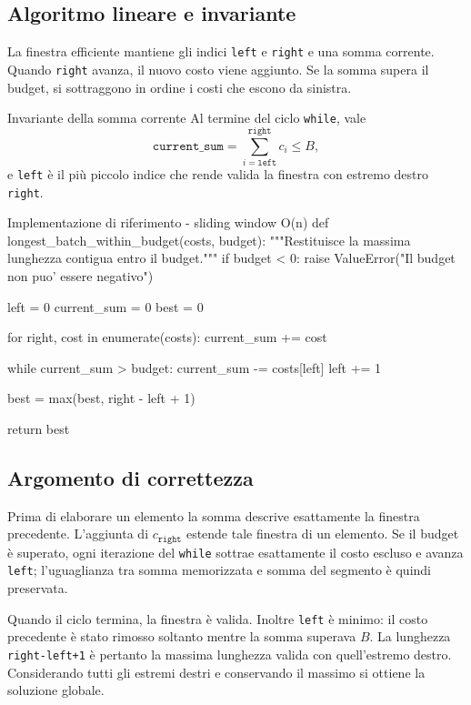 \clearpage
\thispagestyle{fancy}
\noindent\rule{0pt}{1cm}\par
\subsection{Algoritmo lineare e invariante}

La finestra efficiente mantiene gli indici \texttt{left} e \texttt{right} e
una somma corrente. Quando \texttt{right} avanza, il nuovo costo viene
aggiunto. Se la somma supera il budget, si sottraggono in ordine i costi che
escono da sinistra.

\begin{principlebox}{Invariante della somma corrente}
Al termine del ciclo \texttt{while}, vale
\[
\texttt{current\_sum}=\sum_{i=\texttt{left}}^{\texttt{right}}c_i\leq B,
\]
e \texttt{left} è il più piccolo indice che rende valida la finestra con
estremo destro \texttt{right}.
\end{principlebox}

\begin{efficientcode}{Implementazione di riferimento - sliding window O(n)}
def longest_batch_within_budget(costs, budget):
    """Restituisce la massima lunghezza contigua entro il budget."""
    if budget < 0:
        raise ValueError("Il budget non puo' essere negativo")

    left = 0
    current_sum = 0
    best = 0

    for right, cost in enumerate(costs):
        current_sum += cost

        while current_sum > budget:
            current_sum -= costs[left]
            left += 1

        best = max(best, right - left + 1)

    return best
\end{efficientcode}

\subsection{Argomento di correttezza}

Prima di elaborare un elemento la somma descrive esattamente la finestra
precedente. L'aggiunta di $c_{\texttt{right}}$ estende tale finestra di un
elemento. Se il budget è superato, ogni iterazione del \texttt{while} sottrae
esattamente il costo escluso e avanza \texttt{left}; l'uguaglianza tra somma
memorizzata e somma del segmento è quindi preservata.

Quando il ciclo termina, la finestra è valida. Inoltre \texttt{left} è minimo:
il costo precedente è stato rimosso soltanto mentre la somma superava $B$.
La lunghezza \texttt{right-left+1} è pertanto la massima lunghezza valida con
quell'estremo destro. Considerando tutti gli estremi destri e conservando il
massimo si ottiene la soluzione globale.

